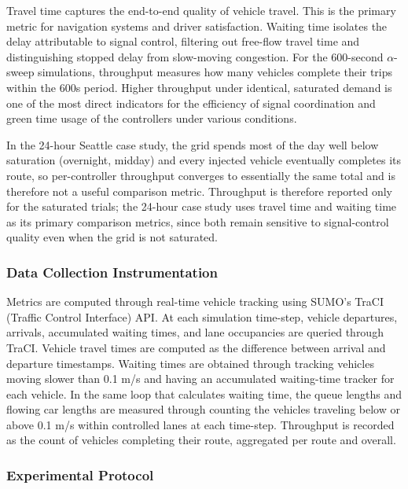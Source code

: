 \documentclass[12pt]{article}
\begin{document}
Travel time captures the end-to-end quality of vehicle travel. This is the primary metric for navigation systems and driver satisfaction. Waiting time isolates the delay attributable to signal control, filtering out free-flow travel time and distinguishing stopped delay from slow-moving congestion. For the 600-second $\alpha$-sweep simulations, throughput measures how many vehicles complete their trips within the 600s period. Higher throughput under identical, saturated demand is one of the most direct indicators for the efficiency of signal coordination and green time usage of the controllers under various conditions.

In the 24-hour Seattle case study, the grid spends most of the day well below saturation (overnight, midday) and every injected vehicle eventually completes its route, so per-controller throughput converges to essentially the same total and is therefore not a useful comparison metric. Throughput is therefore reported only for the saturated trials; the 24-hour case study uses travel time and waiting time as its primary comparison metrics, since both remain sensitive to signal-control quality even when the grid is not saturated.

\subsubsection{Data Collection Instrumentation}

Metrics are computed through real-time vehicle tracking using SUMO's TraCI (Traffic Control Interface) API. At each simulation time-step, vehicle departures, arrivals, accumulated waiting times, and lane occupancies are queried through TraCI. Vehicle travel times are computed as the difference between arrival and departure timestamps. Waiting times are obtained through tracking vehicles moving slower than 0.1 m/s and having an accumulated waiting-time tracker for each vehicle. In the same loop that calculates waiting time, the queue lengths and flowing car lengths are measured through counting the vehicles traveling below or above 0.1 m/s within controlled lanes at each time-step. Throughput is recorded as the count of vehicles completing their route, aggregated per route and overall.

\subsubsection{Experimental Protocol}
\end{document}
